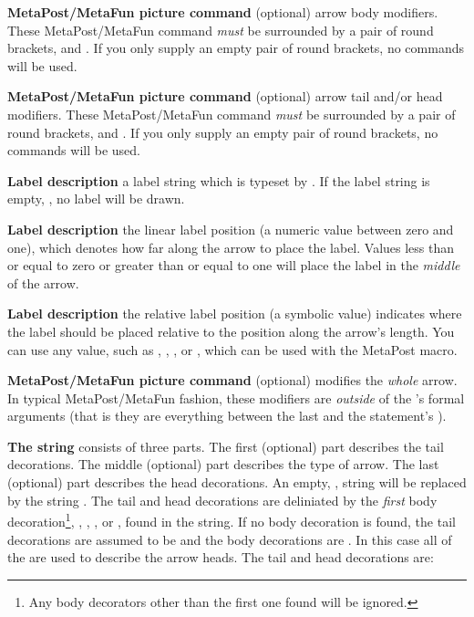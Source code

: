 \item {\bf MetaPost/MetaFun picture command} (optional) arrow body 
modifiers. These MetaPost/MetaFun command \emph{must} be surrounded by a 
pair of round brackets,  and . If you only supply an 
empty pair of round brackets, no commands will be used. 

\item {\bf MetaPost/MetaFun picture command} (optional) arrow tail and/or 
head modifiers. These MetaPost/MetaFun command \emph{must} be surrounded 
by a pair of round brackets,  and . If you only supply 
an empty pair of round brackets, no commands will be used. 

\item {\bf Label description} a label string which is typeset by \ConTeXt. 
If the label string is empty, , no label will be drawn.

\item {\bf Label description} the linear label position (a numeric value 
between zero and one), which denotes how far along the arrow to place the 
label. Values less than or equal to zero or greater than or equal to one 
will place the label in the \emph{middle} of the arrow. 

\item {\bf Label description} the relative label position (a symbolic 
value) indicates where the label should be placed relative to the position 
along the arrow's length. You can use any value, such as , 
, , or , which can be used with the MetaPost 
 macro. 

\item {\bf MetaPost/MetaFun picture command} (optional) modifies the 
\emph{whole} arrow. In typical MetaPost/MetaFun fashion, these modifiers 
are \emph{outside} of the 's formal arguments (that is they 
are everything between the last  and the statement's ). 

\stopitemize


{\bf The  string} consists of three parts. The 
first (optional) part describes the tail decorations. The middle 
(optional) part describes the type of arrow. The last (optional) part 
describes the head decorations. An empty, , 
 string will be replaced by the string . 
The tail and head decorations are deliniated by the \emph{first} body 
decoration\footnote{Any body decorators other than the first one found 
will be ignored.}, , , , or , 
found in the string. If no body decoration is found, the tail decorations 
are assumed to be  and the body decorations are . In 
this case all of the  are used to describe the 
arrow heads. The tail and head decorations are: 


